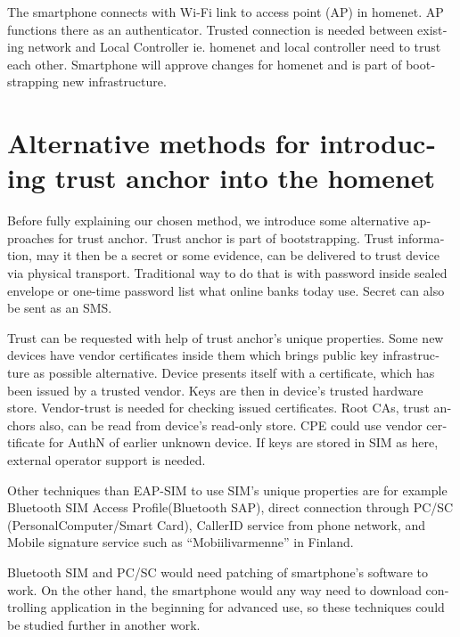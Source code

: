 \documentclass[12pt,a4paper,english]{tutthesis}
\begin{document}
\begin{otherlanguage}{english}
The smartphone connects
 with Wi-Fi link to access point (AP) in homenet.
 AP functions there as an authenticator.
Trusted connection is needed between existing network and Local
Controller ie. homenet and local controller need to trust each other.
Smartphone will approve changes for homenet and is part of bootstrapping
new infrastructure.

\section{Alternative methods for introducing trust anchor into the homenet}
\label{sec-4-1}

Before fully explaining our chosen method, we introduce some
alternative approaches for trust anchor. Trust anchor is part of
bootstrapping. Trust information, may it then be a secret or some
evidence, can be delivered to trust device via physical
transport. Traditional way to do that is with password inside sealed
envelope or one-time password list what online banks today use. Secret
can also be sent as an SMS.

Trust can be requested with help of trust anchor's unique
 properties. Some new devices have vendor certificates inside them which
brings public key infrastructure as possible alternative. Device
presents itself with a certificate, which has been issued by a trusted
vendor.  Keys are then in device's trusted hardware store.
Vendor-trust is needed for checking issued certificates. Root CAs, 
trust anchors also, can be read from device's read-only store. 
CPE could use vendor certificate for AuthN of earlier unknown device.
If keys are stored in SIM as here, external operator support is needed. 


Other techniques than EAP-SIM to use SIM's unique properties
are for example 
Bluetooth SIM Access Profile(Bluetooth  SAP), 
direct connection through PC/SC (Personal\-Computer/Smart\- Card),
CallerID service from phone network, and
Mobile signature service such as ``Mobiilivarmenne'' in Finland.



Bluetooth SIM and PC/SC would need patching of smartphone's software
to work.  On the other hand, the smartphone would any way need to
download controlling application
in the beginning for advanced use, so these techniques could be
studied further in another work.


\end{otherlanguage}
\end{document}
